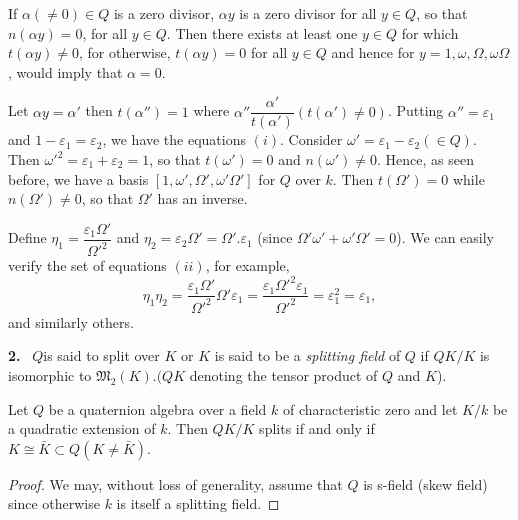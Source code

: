 If $\alpha (\neq 0) \in Q$ is a zero divisor, $\alpha y$ is a zero
divisor for all $y \in Q$, so that $n(\alpha y) =0$, for all $y \in
Q$. Then there exists at least one $y \in Q$ for which $t( \alpha y)
\neq 0$, for otherwise, $t(\alpha y) =0$ for all $y \in Q$ and hence
for $y =1, \omega, \Omega, \omega \Omega$, would imply that $\alpha
=0$. 

Let $\alpha y = \alpha'$ then $t(\alpha'')=1$ where $\alpha''
\dfrac{\alpha'}{t(\alpha')}(t (\alpha') \neq 0)$. Putting $\alpha'' =
\varepsilon_1$ and $1-\varepsilon_1 = \varepsilon_2$, we have the
equations $(i)$. Consider $\omega' = \varepsilon_1 - \varepsilon_2 (
\in Q)$. Then $\omega'^2 = \varepsilon_1 + \varepsilon_2=1$, so that
$t(\omega')=0$ and $n(\omega') \neq 0$. Hence, as seen before, we have
a basis $[1, \omega', \Omega', \omega' \Omega']$ for $Q$ over
$k$. Then $t(\Omega')=0$ while $n(\Omega')\neq 0$, so that $\Omega'$
has an inverse. 

Define $\eta_1 = \dfrac{\varepsilon_1 \Omega'}{\Omega'^2}$ and $
\eta_2 =\varepsilon_2 \Omega'= \Omega'. \varepsilon_1$ (since $\Omega'
\omega' + \omega' \Omega' =0$). We can easily verify the set of
equations $(ii)$, for example, 
 $$
 \eta_1 \eta_2 = \frac{\varepsilon_1 \Omega'}{\Omega'^2} \Omega'
 \varepsilon_1 = \frac{\varepsilon_1 \Omega'^2 \varepsilon_1}{\Omega'^2}
 = \varepsilon^2_1 = \varepsilon_1, 
 $$
 and similarly others.

 \textbf{2.}~ $Q$\pageoriginale is said to split over $K$ or $K$ is said to be a \textit{
   splitting field } of $Q$ if $QK / K$ is isomorphic to $\mathfrak{M}_2(K). (QK$
 denoting the tensor product of $Q$ and $K$). 

\begin{theorem}\label{chap1:sec1:thm3} %
  Let $Q$ be a quaternion algebra over a field $k$ of characteristic
  zero and let $K/k$ be a quadratic extension of $k$. Then $Q K/K$
  splits if and only if $K \cong \bar{K} \subset Q (K \neq \bar{K})$. 
\end{theorem}

\begin{proof}
  We may, without loss of generality, assume that $Q$ is s-field (skew
  field) since otherwise $k$ is itself a splitting field. 
\end{proof}

